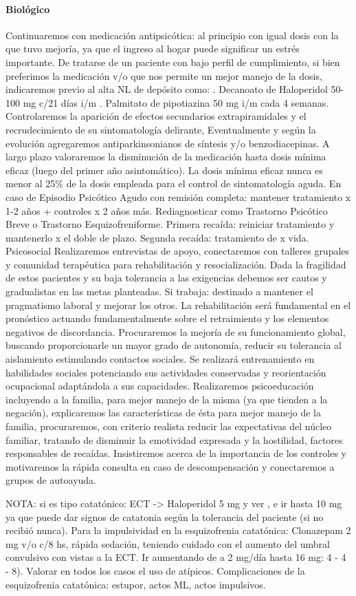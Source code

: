 \paragraph{Biológico}
Continuaremos con medicación antipsicótica\cite{ostuzzi2022preventing}: al principio con igual dosis con la que tuvo mejoría, ya que el ingreso al hogar puede significar un estrés importante. De tratarse de un paciente con bajo perfil de cumplimiento, si bien preferimos la medicación v/o que nos permite un mejor manejo de la dosis, indicaremos previo al alta NL de depósito como: . Decanoato de Haloperidol 50-100 mg c/21 días i/m . Palmitato de pipotiazina 50 mg i/m cada 4 semanas. Controlaremos la aparición de efectos secundarios extrapiramidales y el recrudecimiento de su sintomatología delirante, Eventualmente y según la evolución agregaremos antiparkinsonianos de síntesis y/o benzodiacepinas. A largo plazo valoraremos la disminución de la medicación hasta dosis mínima eficaz (luego del primer año asintomático). La dosis mínima eficaz nunca es menor al 25\% de la dosis empleada para el control de sintomatología aguda. En caso de Episodio Psicótico Agudo con remisión completa: mantener tratamiento x 1-2 años + controles x 2 años más. Rediagnosticar como Trastorno Psicótico Breve o Trastorno Esquizofreniforme. Primera recaída: reiniciar tratamiento y mantenerlo x el doble de plazo. Segunda recaída: tratamiento de x vida. Psicosocial Realizaremos entrevistas de apoyo, conectaremos con talleres grupales y comunidad terapéutica para rehabilitación y resocialización. Dada la fragilidad de estos pacientes y su baja tolerancia a las exigencias debemos ser cautos y gradualistas en las metas planteadas. Si trabaja: destinado a mantener el pragmatismo laboral y mejorar los otros. La rehabilitación será fundamental en el pronóstico actuando fundamentalmente sobre el retraimiento y los elementos negativos de discordancia. Procuraremos la mejoría de su funcionamiento global, buscando proporcionarle un mayor grado de autonomía, reducir su tolerancia al aislamiento estimulando contactos sociales. Se realizará entrenamiento en habilidades sociales potenciando sus actividades conservadas y reorientación ocupacional adaptándola a sus capacidades. Realizaremos psicoeducación incluyendo a la familia, para mejor manejo de la misma (ya que tienden a la negación), explicaremos las características de ésta para mejor manejo de la familia, procuraremos, con criterio realista reducir las expectativas del núcleo familiar, tratando de disminuir la emotividad expresada y la hostilidad, factores responsables de recaídas. Insistiremos acerca de la importancia de los controles y motivaremos la rápida consulta en caso de descompensación y conectaremos a grupos de autoayuda.

NOTA: si es tipo catatónico: ECT -> Haloperidol 5 mg y ver , e ir hasta 10 mg ya que puede dar signos de catatonia según la tolerancia del paciente (si no recibió nunca). Para la impulsividad en la esquizofrenia catatónica: Clonazepam 2 mg v/o c/8 hs, rápida sedación, teniendo cuidado con el aumento del umbral convulsivo con vistas a la ECT. Ir aumentando de a 2 mg/día hasta 16 mg: 4 - 4 - 8). Valorar en todos los casos el uso de atípicos. Complicaciones de la esquizofrenia catatónica: estupor, actos ML, actos impulsivos.
\printbibliography
